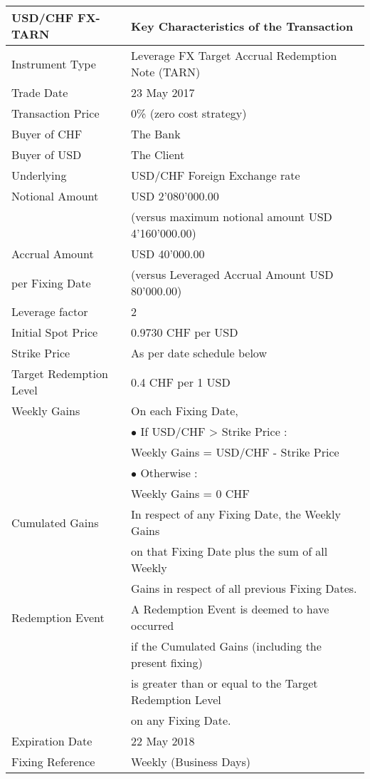 \begin{longtable}{|l|l|} 
\hline
\textbf{USD/CHF FX-TARN} & \textbf{Key Characteristics of the Transaction} \\
\hline 
\hline
Instrument Type & Leverage FX Target Accrual Redemption Note (TARN) \\
\hline
Trade Date & 23 May 2017\\
\hline
Transaction Price & 0\% (zero cost strategy) \\
\hline
Buyer of CHF & The Bank \\
\hline
Buyer of USD & The Client \\
\hline
Underlying & USD/CHF Foreign Exchange rate\\
\hline
Notional Amount & USD 2'080'000.00 \\
&(versus maximum notional amount USD 4'160'000.00)\\
\hline
Accrual Amount & USD 40'000.00\\
per Fixing Date &(versus Leveraged Accrual Amount USD 80'000.00)\\
\hline
Leverage factor &2\\
\hline
Initial Spot Price & 0.9730 CHF per USD\\
\hline
Strike Price & As per date schedule below\\
\hline
Target Redemption Level & 0.4 CHF per 1 USD\\
\hline
Weekly Gains & On each Fixing Date, \\
& $\bullet$ If USD/CHF > Strike Price :\\
& \qquad Weekly Gains = USD/CHF - Strike Price\\ 
& $\bullet$ Otherwise :\\
& \qquad Weekly Gains = 0 CHF\\
\hline
Cumulated Gains & In respect of any Fixing Date, the Weekly Gains \\
& on that Fixing Date plus the sum of all Weekly \\
& Gains in respect of all previous Fixing Dates.\\
\hline
Redemption Event & A Redemption Event is deemed to have occurred \\
& if the Cumulated Gains (including the present fixing)\\ 
& is greater than or equal to the Target Redemption Level\\ 
& on any Fixing Date.\\
\hline
Expiration Date & 22 May 2018 \\
\hline
Fixing Reference & Weekly (Business Days)\\

\end{longtable}
